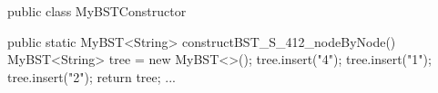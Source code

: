 public class MyBSTConstructor {

	public static MyBST<String> constructBST_S_412_nodeByNode() {
		MyBST<String> tree = new MyBST<>();
		tree.insert("4");
		tree.insert("1");
		tree.insert("2");
		return tree;
	}
	...
}
